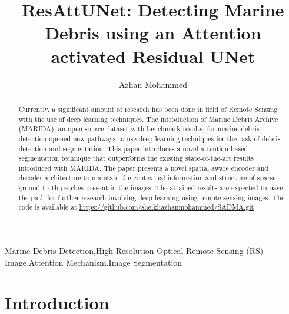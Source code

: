 \documentclass[review]{elsarticle}
\begin{document}
\begin{frontmatter}

\title{ResAttUNet: Detecting Marine Debris using an Attention activated Residual UNet}


\author{Azhan Mohammed}
\address[]{GalaxEye Space}

\begin{abstract}
Currently, a significant amount of research has been done in field of Remote Sensing with the use of deep learning techniques. The introduction of Marine Debris Archive (MARIDA), an open-source dataset with benchmark results, for marine debris detection opened new pathways to use deep learning techniques for the task of debris detection and segmentation. This paper introduces a novel attention based segmentation technique that outperforms the existing state-of-the-art results introduced with MARIDA. The paper presents a novel spatial aware encoder and decoder architecture to maintain the contextual information and structure of sparse ground truth patches present in the images. The attained results are expected to pave the path for further research involving deep learning using remote sensing images. The code is available at \href{https://github.com/sheikhazhanmohammed/SADMA.git}{https://github.com/sheikhazhanmohammed/SADMA.git}

\end{abstract}

\begin{keyword}
Marine Debris Detection\sep High-Resolution Optical Remote Sensing (RS) Image\sep Attention Mechanism\sep Image Segmentation
\end{keyword}

\end{frontmatter}

\section{Introduction}
\end{document}
